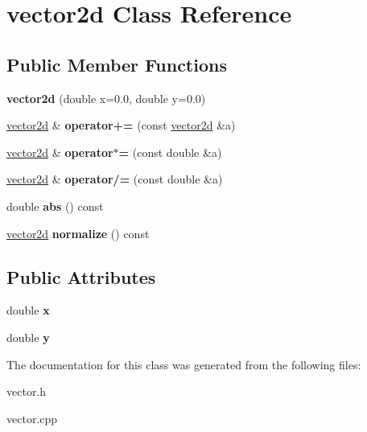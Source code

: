 \hypertarget{classvector2d}{
\section{vector2d Class Reference}
\label{classvector2d}
}
\subsection*{Public Member Functions}
\begin{DoxyCompactItemize}
\item 
\hypertarget{classvector2d_ac826384adecef1c0eca943015e1ddedc}{
{\bfseries vector2d} (double x=0.0, double y=0.0)}
\label{classvector2d_ac826384adecef1c0eca943015e1ddedc}

\item 
\hypertarget{classvector2d_a3e8c9dde385c8306fde0706b15d4c254}{
\hyperlink{classvector2d}{vector2d} \& {\bfseries operator+=} (const \hyperlink{classvector2d}{vector2d} \&a)}
\label{classvector2d_a3e8c9dde385c8306fde0706b15d4c254}

\item 
\hypertarget{classvector2d_afc0dffc198d08e970f26275c58028c2c}{
\hyperlink{classvector2d}{vector2d} \& {\bfseries operator$\ast$=} (const double \&a)}
\label{classvector2d_afc0dffc198d08e970f26275c58028c2c}

\item 
\hypertarget{classvector2d_afd54bec5a628357153c5855f22fb0074}{
\hyperlink{classvector2d}{vector2d} \& {\bfseries operator/=} (const double \&a)}
\label{classvector2d_afd54bec5a628357153c5855f22fb0074}

\item 
\hypertarget{classvector2d_ae93151e886c713eeb7bb87a38f4b04d0}{
double {\bfseries abs} () const }
\label{classvector2d_ae93151e886c713eeb7bb87a38f4b04d0}

\item 
\hypertarget{classvector2d_a6bcc47f3e583a6733780a0b74f312ded}{
\hyperlink{classvector2d}{vector2d} {\bfseries normalize} () const }
\label{classvector2d_a6bcc47f3e583a6733780a0b74f312ded}

\end{DoxyCompactItemize}
\subsection*{Public Attributes}
\begin{DoxyCompactItemize}
\item 
\hypertarget{classvector2d_a364bed799b273eb5c67371f202213db1}{
double {\bfseries x}}
\label{classvector2d_a364bed799b273eb5c67371f202213db1}

\item 
\hypertarget{classvector2d_a19aff60b2cba1422eb16fe5dd62005f2}{
double {\bfseries y}}
\label{classvector2d_a19aff60b2cba1422eb16fe5dd62005f2}

\end{DoxyCompactItemize}


The documentation for this class was generated from the following files:\begin{DoxyCompactItemize}
\item 
vector.h\item 
vector.cpp\end{DoxyCompactItemize}
